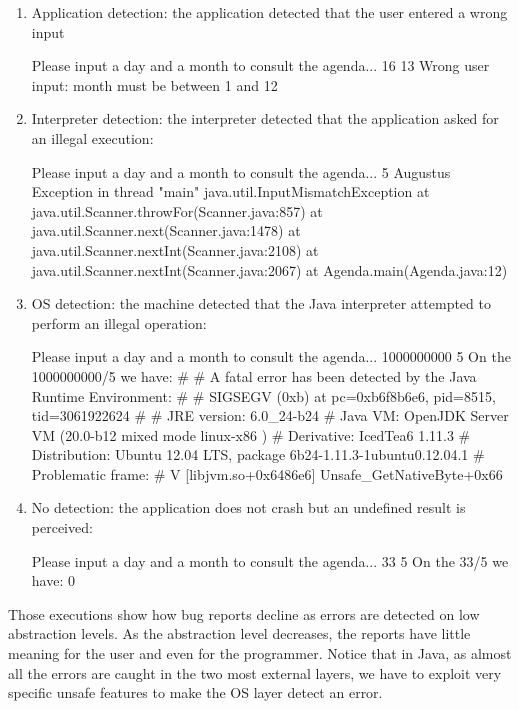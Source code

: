 \documentclass[a4paper]{report}
\begin{document}
\begin{enumerate}
\item Application detection: the application detected that the user entered a wrong input
\begin{shell}
Please input a day and a month to consult the agenda...
16
13
Wrong user input: month must be between 1 and 12
\end{shell}
\item Interpreter detection: the interpreter detected that the application asked for an illegal execution:
\begin{shell}
Please input a day and a month to consult the agenda...
5
Augustus
Exception in thread "main" java.util.InputMismatchException
	at java.util.Scanner.throwFor(Scanner.java:857)
	at java.util.Scanner.next(Scanner.java:1478)
	at java.util.Scanner.nextInt(Scanner.java:2108)
	at java.util.Scanner.nextInt(Scanner.java:2067)
	at Agenda.main(Agenda.java:12)
\end{shell}
\item OS detection: the machine detected that the Java interpreter attempted to perform an illegal operation:
\begin{shell}
Please input a day and a month to consult the agenda...
1000000000
5
On the 1000000000/5 we have: #
# A fatal error has been detected by the Java Runtime Environment:
#
#  SIGSEGV (0xb) at pc=0xb6f8b6e6, pid=8515, tid=3061922624
#
# JRE version: 6.0_24-b24
# Java VM: OpenJDK Server VM (20.0-b12 mixed mode linux-x86 )
# Derivative: IcedTea6 1.11.3
# Distribution: Ubuntu 12.04 LTS, package 6b24-1.11.3-1ubuntu0.12.04.1
# Problematic frame:
# V  [libjvm.so+0x6486e6]  Unsafe_GetNativeByte+0x66

\end{shell}
\item No detection: the application does not crash but an undefined result is perceived:
\begin{shell}
Please input a day and a month to consult the agenda...
33
5
On the 33/5 we have: 0
\end{shell}
\end{enumerate}
Those executions show how bug reports decline as errors are detected on low abstraction levels. As the abstraction level decreases, the reports have little meaning for the user and even for the programmer. Notice that in Java, as almost all the errors are caught in the two most external layers, we have to exploit very specific unsafe features to make the OS layer detect an error.
\end{document}

